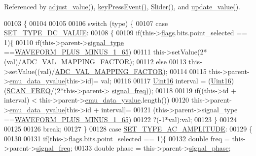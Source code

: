 Referenced by \hyperlink{a00133_source_l00069}{adjust\+\_\+value()}, \hyperlink{a00133_source_l00219}{key\+Press\+Event()}, \hyperlink{a00133_source_l00014}{Slider()}, and \hyperlink{a00133_source_l00088}{update\+\_\+value()}.


\begin{DoxyCode}
00103 \{
00104 
00105 
00106     \textcolor{keywordflow}{switch} (type) \{
00107     \textcolor{keywordflow}{case} \hyperlink{a00090_a347f6ec80828b93988d22989c0df015f}{SET\_TYPE\_DC\_VALUE}:
00108      \{
00109         \textcolor{keywordflow}{if}(this->\hyperlink{a00077_ade6449558d429b66e5ed1381bc9b9060}{flags}.bits.point\_selected == 1)\{
00110             \textcolor{keywordflow}{if}(this->parent->\hyperlink{a00008_a070edaec5aee6ba1f5a6866bc32c8ce4}{signal\_type} ==\hyperlink{a00090_a0923d3b365a36e1e8c401cec964aa36f}{WAVEFORM\_PLUS\_MINUS\_1\_65})
00111             this->setValue(2*(val)/\hyperlink{a00086_ada92d3eeeec0cbeee41e76a52d145792}{ADC\_VAL\_MAPPING\_FACTOR});
00112             \textcolor{keywordflow}{else}
00113             this->setValue((val)/\hyperlink{a00086_ada92d3eeeec0cbeee41e76a52d145792}{ADC\_VAL\_MAPPING\_FACTOR});
00114 
00115         this->parent->\hyperlink{a00008_ad922d05d1e988d84f404c115fe909f72}{emu\_data\_yvalue}[this->id]= val;
00116 
00117         \hyperlink{a00004_aae7407b021d43f7193a81a58cfb3e297}{Uint16} interval = (\hyperlink{a00004_aae7407b021d43f7193a81a58cfb3e297}{Uint16})(\hyperlink{a00086_a8127170b687c1f67a968886c128e76e4}{SCAN\_FREQ}/(2*this->parent->
      \hyperlink{a00008_a67039999d520fc483fab521fae5ddde4}{signal\_freq}));
00118 
00119         \textcolor{keywordflow}{if}((this->\textcolor{keywordtype}{id} + interval) < this->parent->\hyperlink{a00008_ad922d05d1e988d84f404c115fe909f72}{emu\_data\_yvalue}.length())
00120         this->parent->\hyperlink{a00008_ad922d05d1e988d84f404c115fe909f72}{emu\_data\_yvalue}[this->id + interval]=
00121         (this->parent->signal\_type ==\hyperlink{a00090_a0923d3b365a36e1e8c401cec964aa36f}{WAVEFORM\_PLUS\_MINUS\_1\_65})
00122         ?(-1*val):val;
00123         \}
00124 
00125 
00126         \textcolor{keywordflow}{break};
00127     \}
00128     \textcolor{keywordflow}{case} \hyperlink{a00090_a704f34d2cc6c149f96e9da9d2a1aa8c0}{SET\_TYPE\_AC\_AMPLITUDE}:
00129       \{
00130 
00131         \textcolor{keywordflow}{if}(this->\hyperlink{a00077_ade6449558d429b66e5ed1381bc9b9060}{flags}.bits.point\_selected == 1)\{
00132         \textcolor{keywordtype}{double} freq    = this->parent->\hyperlink{a00008_a67039999d520fc483fab521fae5ddde4}{signal\_freq};
00133         \textcolor{keywordtype}{double} phase   = this->parent->\hyperlink{a00008_af08de88fdfe283086e3cca97a2965678}{signal\_phase};

\end{DoxyCode}
